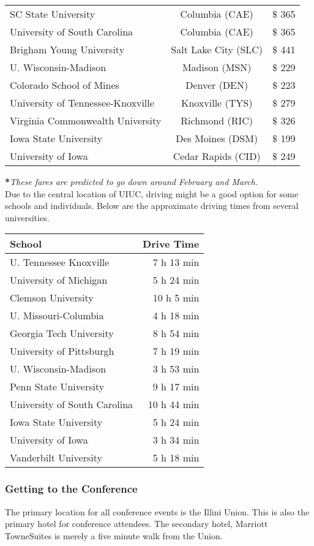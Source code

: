 \begin{center}
\begin{tabular}{lcc}
		SC State University & Columbia (CAE) & $\$$ 365\\
		University of South Carolina & Columbia (CAE) & $\$$ 365\\
		Brigham Young University & Salt Lake City (SLC) & $\$$ 441\\
		U. Wisconsin-Madison & Madison (MSN) & $\$$ 229\\
		Colorado School of Mines & Denver (DEN)& $\$$ 223\\
		University of  Tennessee-Knoxville & Knoxville (TYS) & $\$$ 279\\
		Virginia Commonwealth University & Richmond (RIC) & $\$$ 326 \\
		Iowa State University & Des Moines (DSM) & $\$$ 199 \\
		University of Iowa & Cedar Rapids (CID) & $\$$ 249 \\
	\end{tabular}	
\end{center}
\textbf{*}\textit{These fares are predicted to go down around February and March.}\\

Due to the central location of UIUC, driving might be a good option for some schools and individuals. Below are the approximate driving times from several universities. 
\begin{center}
	\begin{tabular}{l r}
	\hline\hline
	\textbf{School}& \textbf{Drive Time}\\
	\hline\hline
	U. Tennessee Knoxville & 7 h 13 min\\
	University of Michigan & 5 h 24 min\\
	Clemson University & 10 h 5 min\\
	U. Missouri-Columbia & 4 h 18 min\\
	Georgia Tech University & 8 h 54 min \\
	University of Pittsburgh & 7 h 19 min\\
	U. Wisconsin-Madison & 3 h 53 min \\
	Penn State University & 9 h 17 min\\
	University of South Carolina& 10 h 44 min\\
	Iowa State University & 5 h 24 min \\
	University of Iowa & 3 h 34 min\\
	Vanderbilt University & 5 h 18 min\\
	\end{tabular}
\end{center}

\subsubsection{Getting to the Conference}
The primary location for all conference events is the Illini Union. This is also the primary hotel for conference attendees. The secondary hotel, Marriott TowneSuites is merely a five minute walk from the Union. 